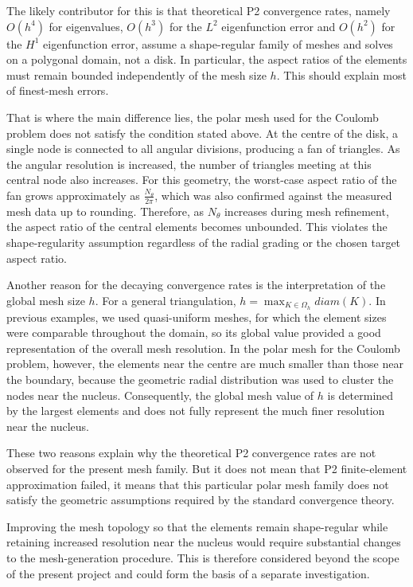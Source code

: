 \documentclass[conference]{IEEEtran}
\begin{document}
The likely contributor for this is that theoretical P2 convergence rates, namely $O(h^4)$ for eigenvalues, $O(h^3)$ for the $L^2$ eigenfunction error and $O(h^2)$ for the $H^1$ eigenfunction error, assume a shape-regular family of meshes and solves on a polygonal domain, not a disk. In particular, the aspect ratios of the elements must remain bounded independently of the mesh size $h$. This should explain most of finest-mesh errors.

That is where the main difference lies, the polar mesh used for the Coulomb problem does not satisfy the condition stated above. At the centre of the disk, a single node is connected to all angular divisions, producing a fan of triangles. As the angular resolution is increased, the number of triangles meeting at this central node also increases. For this geometry, the worst-case aspect ratio of the fan grows approximately as $\frac{N_{\theta}}{2\pi}$, which was also confirmed against the measured mesh data up to rounding. Therefore, as $N_\theta$ increases during mesh refinement, the aspect ratio of the central elements becomes unbounded. This violates the shape-regularity assumption regardless of the radial grading or the chosen target aspect ratio.

Another reason for the decaying convergence rates is the interpretation of the global mesh size $h$. For a general triangulation, $h = \max_{K \in \Omega_h}diam(K)$. In previous examples, we used quasi-uniform meshes, for which the element sizes were comparable throughout the domain, so its global value provided a good representation of the overall mesh resolution. In the polar mesh for the Coulomb problem, however, the elements near the centre are much smaller than those near the boundary, because the geometric radial distribution was used to cluster the nodes near the nucleus. Consequently, the global mesh value of $h$ is determined by the largest elements and does not fully represent the much finer resolution near the nucleus.

These two reasons explain why the theoretical P2 convergence rates are not observed for the present mesh family. But it does not mean that P2 finite-element approximation failed, it means that this particular polar mesh family does not satisfy the geometric assumptions required by the standard convergence theory.

Improving the mesh topology so that the elements remain shape-regular while retaining increased resolution near the nucleus would require substantial changes to the mesh-generation procedure. This is therefore considered beyond the scope of the present project and could form the basis of a separate investigation.
\end{document}
